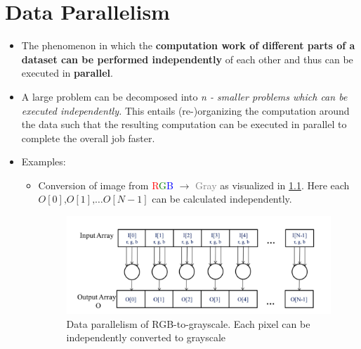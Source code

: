 \chapter{Data Parallelism}
\begin{itemize}
    \item The phenomenon in which the \textbf{computation work of different parts of a dataset can be performed independently} of each other and thus can be executed in \textbf{parallel}.
    \item A large problem can be decomposed into \textit{n - smaller problems which can be executed independently. } This entails (re-)organizing the computation around the data such that the resulting computation can be executed in parallel to complete the overall job faster.
    \item Examples:
          \begin{itemize}
              \item Conversion of image from \textcolor{red}{R}\textcolor{green}{G}\textcolor{blue}{B}  $\rightarrow $ \textcolor{gray}{Gray} as visualized in \ref{fig:dp-rgb-gray-flowchart}.  Here each $\mathit{O}[0]\text{,} \mathit{O}[1]\text{,} \dots \mathit{O}[N-1]$ can be calculated independently.
                    \begin{figure}[!h]
                        \centering
                        \includegraphics[width=0.7\linewidth]{Images/DP/rgb_to_gray_dataParallel.png}
                        \caption{Data parallelism of RGB-to-grayscale. Each pixel can be independently converted to grayscale}
                        \label{fig:dp-rgb-gray-flowchart}
                    \end{figure}
          \end{itemize}

\end{itemize}

